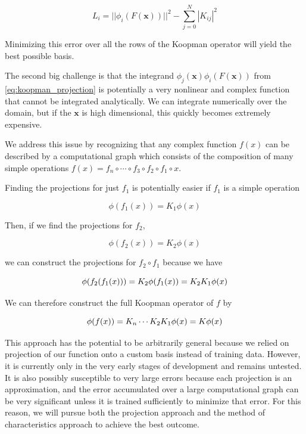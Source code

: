 \documentclass[12pt, letterpaper]{article}
\begin{document}
\begin{equation}
    L_i = ||\phi_i(F(\mathbf{x}))||^2 - \overset{N}{\underset{j = 0}{\sum}} |K_{ij}|^2
\end{equation}

Minimizing this error over all the rows of the Koopman operator will yield the best possible basis.

The second big challenge is that the integrand $\phi_j(\mathbf{x}) \phi_i(F(\mathbf{x}))$ from \ref{eq:koopman_projection} is potentially a very nonlinear and complex function that cannot be integrated analytically.  We can integrate numerically over the domain, but if the $\mathbf{x}$ is high dimensional, this quickly becomes extremely expensive.

We address this issue by recognizing that any complex function $f(x)$ can be described by a computational graph which consists of the composition of many simple operations $f(x) = f_n \circ \cdots \circ f_3 \circ f_2 \circ f_1 \circ x$.  

Finding the projections for just $f_1$ is potentially easier if $f_1$ is a simple operation

\begin{equation}
    \phi(f_1(x)) = K_1 \phi(x)
\end{equation}

Then, if we find the projections for $f_2$, 

\begin{equation}
    \phi(f_2(x)) = K_2 \phi(x)
\end{equation}

we can construct the projections for $f_2 \circ f_1$ because we have

\begin{equation}
    \phi(f_2(f_1(x))) = K_2 \phi(f_1(x)) = K_2 K_1 \phi(x)\\ 
\end{equation}

We can therefore construct the full Koopman operator of $f$ by

\begin{equation}
    \phi(f(x)) = K_n \cdots K_2 K_1 \phi(x) = K \phi(x)\\ 
\end{equation}

This approach has the potential to be arbitrarily general because we relied on projection of our function onto a custom basis instead of training data.  However, it is currently only in the very early stages of development and remains untested.  It is also possibly susceptible to very large errors because each projection is an approximation, and the error accumulated over a large computational graph can be very significant unless it is trained sufficiently to minimize that error. For this reason, we will pursue both the projection approach and the method of characteristics approach to achieve the best outcome.
\end{document}
